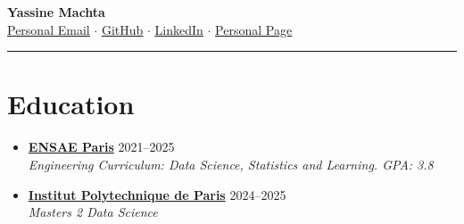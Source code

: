 \documentclass[letterpaper,11pt,twocolumn]{article}
\newcommand{\resumeSubheading}[4]{
  \vspace{-2pt}\item \textbf{#1} \hfill #2 \\
  \textit{\small #3} \hfill \textit{\small #4} 
  \vspace{-7pt}
}
\begin{document}
\begin{center}
  {\LARGE \textbf{Yassine Machta}} \\[5pt]
   \href{mailto:machtayassine@gmail.com}{\underline{Personal Email}} $\cdot$ 
   \href{https://github.com/MachtaYassine}{ \underline{GitHub}} $\cdot$ 
   \href{https://www.linkedin.com/in/yassine-machta-a00307206/}{ \underline{LinkedIn}} $\cdot$ 
   \href{https://machtayassine.github.io}{ \underline{Personal Page}}
\end{center}

\vspace{-10pt}
\hrule
\vspace{-10pt}

\section{Education}
\begin{itemize}[leftmargin=*]
  \resumeSubheading
    {\href{https://www.ensae.fr/en}{ENSAE Paris}}{2021--2025}
    {Engineering Curriculum: Data Science, Statistics and Learning. GPA: 3.8}{}
  \resumeSubheading
    {\href{https://www.ip-paris.fr/}{Institut Polytechnique de Paris}}{2024--2025}
    {Masters 2 Data Science}{}
\end{itemize}

\end{document}
